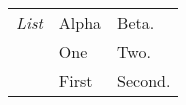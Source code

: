 
\usepackage{array}

\setlength{\extrarowheight}{4pt}

\begin{tabular}{@{}>{\itshape}ll!{:}l<{.}@{}}
    \hline
    List & Alpha & Beta\\
    & One & Two\\
    & First & Second\\
    \hline
\end{tabular}
